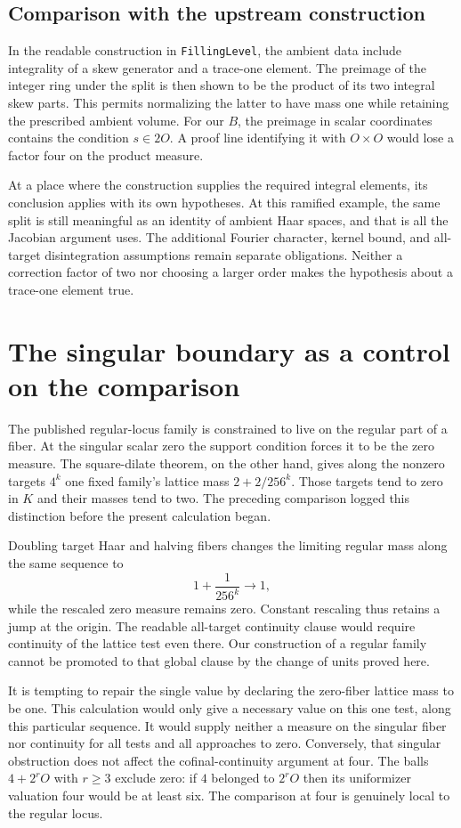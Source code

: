 \documentclass[12pt,letterpaper]{article}
\newcommand{\id}[1]{{\small\nolinkurl{#1}}}
\begin{document}
\subsection{Comparison with the upstream construction}
In the readable construction in \id{FillingLevel}, the ambient data include integrality of a skew generator and a trace-one element. The preimage of the integer ring under the split is then shown to be the product of its two integral skew parts. This permits normalizing the latter to have mass one while retaining the prescribed ambient volume. For our $B$, the preimage in scalar coordinates contains the condition $s\in2O$. A proof line identifying it with $O\times O$ would lose a factor four on the product measure.

At a place where the construction supplies the required integral elements, its conclusion applies with its own hypotheses. At this ramified example, the same split is still meaningful as an identity of ambient Haar spaces, and that is all the Jacobian argument uses. The additional Fourier character, kernel bound, and all-target disintegration assumptions remain separate obligations. Neither a correction factor of two nor choosing a larger order makes the hypothesis about a trace-one element true.

\section{The singular boundary as a control on the comparison}
The published regular-locus family is constrained to live on the regular part of a fiber. At the singular scalar zero the support condition forces it to be the zero measure. The square-dilate theorem, on the other hand, gives along the nonzero targets $4^k$ one fixed family's lattice mass $2+2/256^k$. Those targets tend to zero in $K$ and their masses tend to two. The preceding comparison logged this distinction before the present calculation began.

Doubling target Haar and halving fibers changes the limiting regular mass along the same sequence to
\[
                  1+\frac{1}{256^k}\longrightarrow 1,
\]
while the rescaled zero measure remains zero. Constant rescaling thus retains a jump at the origin. The readable all-target continuity clause would require continuity of the lattice test even there. Our construction of a regular family cannot be promoted to that global clause by the change of units proved here.

It is tempting to repair the single value by declaring the zero-fiber lattice mass to be one. This calculation would only give a necessary value on this one test, along this particular sequence. It would supply neither a measure on the singular fiber nor continuity for all tests and all approaches to zero. Conversely, that singular obstruction does not affect the cofinal-continuity argument at four. The balls $4+2^rO$ with $r\ge3$ exclude zero: if $4$ belonged to $2^r O$ then its uniformizer valuation four would be at least six. The comparison at four is genuinely local to the regular locus.
\end{document}
